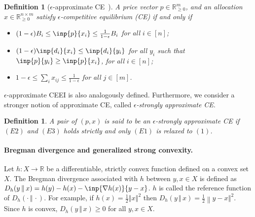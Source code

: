 \documentclass[format=acmsmall,authorversion]{acmart}
\newtheorem{definition}[theorem]{Definition}
\newcommand{\BRC}[1]{{\textcolor{red}{BRC: #1}}}
\begin{document}
\begin{definition}[$\epsilon$-approximate CE~\cite{boodaghians2022polynomial}] 
   \label{def:appx-CEEI}
A price vector $p \in \mathbb{R}^m_{\geq 0}$, and an allocation $x \in \mathbb{R}^{n \times m}_{\geq 0}$ satisfy $\epsilon$-\emph{competitive equilibrium} (CE) if and only if
    \begin{itemize} 
        \item[(1)] $(1 - \epsilon) B_i \leq \inp{p}{x_i} \leq \frac{1}{1 - \epsilon} B_i$ for all $i \in [n]$; 
        \item[(2)] $(1 - \epsilon) \inp{d_i}{x_i} \leq \inp{d_i}{y_i}$ for all $y_i$ such that $\inp{p}{y_i} \geq \inp{p}{x_i}$, for all $i \in [n]$; 
        \item[(3)] $1 - \epsilon \leq \sum_i x_{ij} \leq \frac{1}{1 - \epsilon}$ for all $j \in [m]$. 
    \end{itemize}
\end{definition} 
$\epsilon$-approximate CEEI is also analogously defined. Furthermore, we consider a stronger notion of approximate CE, called \emph{$\epsilon$-strongly approximate CE}. 

\begin{definition}\label{def:sappx-CEEI} A pair of $(p, x)$ is said to be an $\epsilon$-strongly approximate CE if $(E2)$ and $(E3)$ holds strictly and only $(E1)$ is relaxed to $(1)$. 
\end{definition}
 

\paragraph{Bregman divergence and generalized strong convexity.} 
Let $h: X \rightarrow \mathbb{R}$ be a differentiable, strictly convex function defined on a convex set $X$. 
The Bregman divergence associated with $h$ between $y, x \in X$ is defined as 
$D_h(y \,\Vert\, x) = h(y) - h(x) - \inp{\nabla h(x)}{y - x}$. 
$h$ is called the reference function of $D_h(\cdot\,\Vert\,\cdot)$. 
For example, if $h(x) = \frac{1}{2} {\left\Vert x \right\Vert}^2$ then 
$D_h(y\,\Vert\,x) = \frac{1}{2} {\left\lVert y - x \right\Vert}^2$. 
Since $h$ is convex, $D_h(y \,\Vert\, x) \geq 0$ for all $y, x \in X$.  
\end{document}
